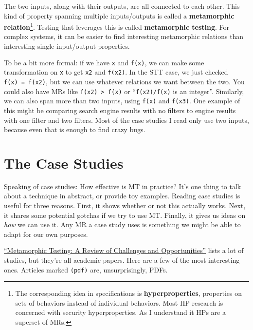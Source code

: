 The two inputs, along with their outputs, are all connected to each
other. This kind of property spanning multiple inputs/outputs is called
a \textbf{metamorphic
relation}\footnote{The corresponding idea in
  specifications is \textbf{hyperproperties}, properties on sets of
  behaviors instead of individual behaviors. Most HP research is
  concerned with security hyperproperties. As I understand it HPs are a
  superset of MRs.}.
Testing that leverages this is called \textbf{metamorphic testing}. For
complex systems, it can be easier to find interesting metamorphic
relations than interesting single input/output properties.

To be a bit more formal: if we have \texttt{x} and \texttt{f(x)}, we can
make some transformation on \texttt{x} to get \texttt{x2} and
\texttt{f(x2)}. In the STT case, we just checked
\texttt{f(x)\ =\ f(x2)}, but we can use whatever relations we want
between the two. You could also have MRs like
\texttt{f(x2)\ \textgreater{}\ f(x)} or ``\texttt{f(x2)/f(x)} is an
integer''. Similarly, we can also span more than two inputs, using
\texttt{f(x)} and \texttt{f(x3)}. One example of this might be comparing
search engine results with no filters to engine results with one filter
and two filters. Most of the case studies I read only use two inputs,
because even that is enough to find crazy bugs.

\section{The Case Studies}\label{the-case-studies}

Speaking of case studies: How effective is MT in practice? It's one
thing to talk about a technique in abstract, or provide toy examples.
Reading case studies is useful for three reasons. First, it shows
whether or not this actually works. Next, it shares some potential
gotchas if we try to use MT. Finally, it gives us ideas on \emph{how} we
can use it. Any MR a case study uses is something we might be able to
adapt for our own purposes.

\href{http://www.cs.hku.hk/research/techreps/document/TR-2017-04.pdf}{``Metamorphic
Testing: A Review of Challenges and Opportunities''} lists a lot of
studies, but they're all academic papers. Here are a few of the most
interesting ones. Articles marked \texttt{(pdf)} are, unsurprisingly,
PDFs.

